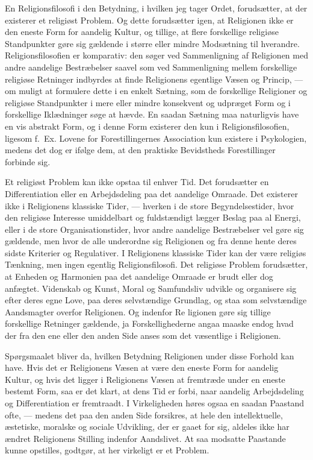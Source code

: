\documentclass[12pt,a4paper]{article}
\newcommand{\opage}[1]{\marginnote{\footnotesize\textit{[#1]}}}
\begin{document}
En Religionsfilosofi i den Betydning, i hvilken jeg tager Ordet, forudsætter,
at der existerer et religiøst Problem. Og dette forudsætter igen, at
Religionen ikke er den eneste Form for aandelig Kultur, og tillige, at flere
forskellige religiøse Standpunkter gøre sig gældende i større eller mindre
Modsætning til hverandre. Religionsfilosofien er komparativ: den søger ved
Sammenligning af Religionen med andre aandelige Bestræbelser saavel som ved
Sammenligning mellem forskellige religiøse Retninger indbyrdes at finde
Religionens egentlige Væsen og Princip, --- om muligt at formulere dette i en
enkelt Sætning, som de forskellige Religioner og religiøse Standpunkter i mere
eller mindre konsekvent og udpræget Form og i forskellige Iklædninger søge at
hævde. En saadan Sætning maa naturligvis have en vis abstrakt Form, og i denne
Form existerer den kun i Religionsfilosofien, ligesom f.\ Ex. Lovene for
Forestillingernes Association kun existere i Psykologien, medens det dog er
ifølge dem, at den praktiske Bevidstheds Forestillinger forbinde sig.

Et religiøst Problem kan ikke opstaa til enhver Tid. Det forudsætter en
Differentiation eller en Arbejdsdeling paa det aandelige Omraade. Det
existerer ikke i Religionens klassiske Tider, --- hverken i de store
Begyndelsestider, hvor den religiøse Interesse umiddelbart og fuldstændigt
lægger Beslag paa al Energi, eller i de store Organisationstider, hvor andre
aandelige Bestræbelser vel gøre sig gældende, men hvor de alle underordne sig
Religionen og fra denne hente deres sidste Kriterier og Regulativer. I
Religionens klassiske Tider kan der være religiøs Tænkning, men ingen egentlig
Religionsfilosofi. Det religiøse Problem forudsætter, at Enheden og Harmonien
paa det aandelige Omraade er brudt eller dog anfægtet. Videnskab og Kunst,
Moral og Samfundsliv udvikle og organisere sig efter deres egne Love, paa
deres selvstændige Grundlag, og staa som selvstændige Aandsmagter overfor
Religionen. Og indenfor Re%
\opage{413}ligionen
gøre sig tillige forskellige Retninger gældende, ja Forskellighederne angaa
maaske endog hvad der fra den ene eller den anden Side anses som det
væsentlige i Religionen.

Spørgsmaalet bliver da, hvilken Betydning Religionen under disse Forhold kan
have. Hvis det er Religionens Væsen at være den eneste Form for aandelig
Kultur, og hvis det ligger i Religionens Væsen at fremtræde under en eneste
bestemt Form, saa er det klart, at dens Tid er forbi, naar aandelig
Arbejdsdeling og Differentiation er fremtraadt. I Virkeligheden høres ogsaa en
saadan Paastand ofte, --- medens det paa den anden Side forsikres, at hele den
intellektuelle, æstetiske, moralske og sociale Udvikling, der er gaaet for
sig, aldeles ikke har ændret Religionens Stilling indenfor Aandslivet. At saa
modsatte Paastande kunne opstilles, godtgør, at her virkeligt er et Problem.
\end{document}
